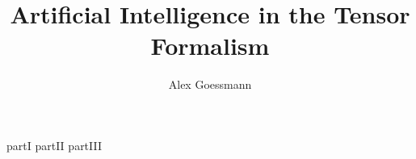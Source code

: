 \documentclass[graybox,envcountchap,sectrefs]{style-files/SNmono}
\begin{document}
    \author{Alex Goessmann}
    \title{Artificial Intelligence in the Tensor Formalism}
    \maketitle

    \frontmatter%

%
%
%
%
%

    \tableofcontents

    

    

    \mainmatter%

    {partI}
    {partII}
    {partIII}
%    
%    
%    

    \backmatter%
    
%    
    \printindex

    
    
\end{document}
